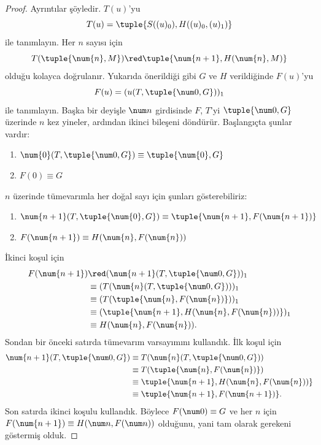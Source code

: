 \begin{proof}
Ayrıntılar şöyledir. $T(u)$'yu
\[
T(u) = \tuple{S((u)_0), H((u)_0,(u)_1)}
\]
ile tanımlayın. Her $n$ sayısı için
\[
T(\tuple{\num{n}, M}) \red \tuple{\num{n+1}, H(\num{n}, M)}
\]
olduğu kolayca doğrulanır. Yukarıda önerildiği gibi $G$ ve $H$ verildiğinde
$F(u)$'yu
\[
F(u) = (u(T,\tuple{\num 0, G}))_1
\]
ile tanımlayın. Başka bir deyişle $\num n$ girdisinde $F$, $T$'yi
$\tuple{\num 0,G}$ üzerinde $n$ kez yineler, ardından ikinci bileşeni
döndürür. Başlangıçta şunlar vardır:
\begin{enumerate}
\item $\num{0} (T, \tuple{\num 0, G}) \equiv \tuple{\num{0}, G}$
\item $F(\num{0}) \equiv G$
\end{enumerate}
$n$ üzerinde tümevarımla her doğal sayı için şunları gösterebiliriz:
\begin{enumerate}
\item $\num{n+1}(T, \tuple{\num{0}, G}) \equiv \tuple{\num{n+1}, F(\num{n+1})}$
\item $F(\num{n+1}) \equiv H(\num{n}, F(\num{n}))$
\end{enumerate}
İkinci koşul için
\begin{align*}
F(\num{n+1}) & \red (\num{n+1}(T, \tuple{\num 0, G}))_1 \\
& \equiv (T(\num{n} (T, \tuple{\num 0, G})))_1 \\
& \equiv (T(\tuple{\num{n}, F(\num{n})}))_1 \\
& \equiv (\tuple{\num{n+1}, H(\num{n}, F(\num{n}))})_1 \\
& \equiv H(\num{n}, F(\num{n})).
\end{align*}
Sondan bir önceki satırda tümevarım varsayımını kullandık. İlk koşul için
\begin{align*}
\num{n+1} (T, \tuple{\num 0, G}) &
\equiv T(\num{n} (T, \tuple{\num 0, G})) \\
& \equiv T( \tuple{\num{n}, F(\num{n})}) \\
& \equiv \tuple{\num{n+1}, H(\num{n}, F(\num{n}))} \\
& \equiv \tuple{\num{n+1}, F(\num{n+1})}.
\end{align*}
Son satırda ikinci koşulu kullandık. Böylece $F(\num 0)\equiv G$ ve her $n$
için $F(\num{n+1})\equiv H(\num n,F(\num n))$ olduğunu, yani tam olarak
gerekeni göstermiş olduk.
\end{proof}

